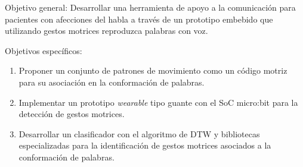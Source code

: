 \hfill\break 
Objetivo general: \hfill\break
Desarrollar una herramienta de apoyo a la comunicación para pacientes con afecciones del habla a través de un prototipo embebido que utilizando gestos motrices reproduzca palabras con voz.

\hfill\break
Objetivos específicos:	
\begin{enumerate}

	\item \justifying Proponer un conjunto de patrones de movimiento como un código motriz para su asociación en la conformación de palabras.
	
	\item \justifying Implementar un prototipo \textit{wearable} tipo guante con el SoC micro:bit para la detección de gestos motrices.

	\item \justifying Desarrollar un clasificador con el algoritmo de DTW y bibliotecas especializadas para la identificación de gestos motrices asociados a la conformación de palabras.
\end{enumerate}